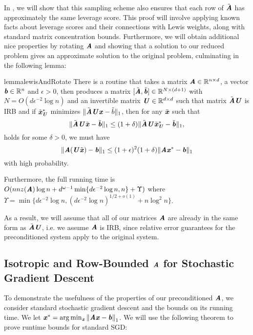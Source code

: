 In , we will show that this sampling scheme also ensures that
each row of $\tilde{\AA}$ has approximately the same leverage score.
This proof will involve applying known facts about leverage scores and their connections with Lewis weights, along with standard matrix concentration bounds.
Furthermore, we will obtain additional nice properties by rotating $\AA$
and showing that a solution to our reduced problem gives an approximate solution to the original problem,
culminating in the following lemma:

\begin{restatable}{lemma}{lewisAndRotate}
	\label{lem:lewisAndRotate}
	There is a routine that takes
	a matrix $\AA \in \R^{n \times d}$,	a vector $\bb \in \R^{n}$ and $\epsilon > 0$,
	then produces a matrix $[\tilde{\AA},\tilde{\bb}] \in \R^{N \times (d+1)}$
	with $N = O(d\epsilon^{-2}\log{n})$
	and an invertible matrix $\UU \in \R^{d \times d}$
	such that matrix $\tilde{\AA}\UU$ is IRB and
	if $\tilde{\xx}_{\UU}^*$ minimizes $\|\tilde{\AA}\UU\xx - \tilde{b}\|_1$,
	then for any $\tilde{\xx}$ such that 
	\[ \|\tilde{\AA}\UU\tilde{\xx} - \tilde{\bb}\|_1\leq (1 + \delta) \|\tilde{\AA}\UU\tilde{\xx}_{\UU}^* - \tilde{\bb}\|_1, \]
	holds for some $\delta > 0$, we must have 
	\[
	\|\AA(\UU\tilde{\xx}) - \bb\|_1 \leq (1 + \epsilon)^2(1 + \delta)\|\AA \xx^* - \bb \|_1 \]
	with high probability.
	
	Furthermore, the full running time is
	$O(nnz(\AA)\log{n} + d^{\omega-1}\min\{d\epsilon^{-2}\log{n},n\} + \Upsilon)$ where $\Upsilon = \min\{d\epsilon^{-2}\log{n}, (d\epsilon^{-2}\log{n})^{1/2 + o(1)} + n\log^2{n}\}$.
\end{restatable}

As a result, we will assume that all of our matrices $\AA$ are already in the same form as $\tilde{\AA}\UU$, i.e. we assume $\AA$ is IRB, since relative error guarantees for the preconditioned system apply to the original system.


\subsection{Isotropic and Row-Bounded $\AA$ for Stochastic Gradient Descent}\label{subsec:sgd}

To demonstrate the usefulness of the properties of our preconditioned $\AA$,
we consider standard stochastic gradient descent and the bounds on its running time. We let $\xx^* = \arg\min_{\xx} \norm{\AA\xx - \bb}_1$. We will use the following theorem to prove runtime bounds for standard SGD:

